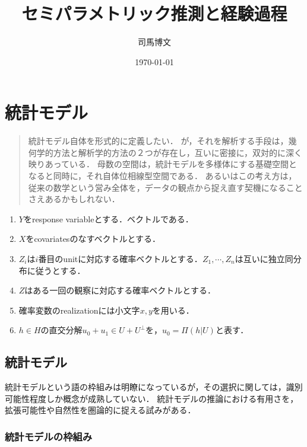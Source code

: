 \documentclass[uplatex,dvipdfmx]{jsreport}
\title{セミパラメトリック推測と経験過程}
\author{司馬博文}
\date{\today}
\begin{document}
\mgfamily
\tableofcontents

\chapter{統計モデル}

\begin{quotation}
    統計モデル自体を形式的に定義したい．
    が，それを解析する手段は，幾何学的方法と解析学的方法の２つが存在し，互いに密接に，双対的に深く映りあっている．
    母数の空間は，統計モデルを多様体にする基礎空間となると同時に，それ自体位相線型空間である．
    あるいはこの考え方は，従来の数学という営み全体を，データの観点から捉え直す契機になることさえあるかもしれない．
\end{quotation}

\begin{notation}
    \begin{enumerate}
        \item $Y$をresponse variableとする．ベクトルである．
        \item $X$をcovariatesのなすベクトルとする．
        \item $Z_i$は$i$番目のunitに対応する確率ベクトルとする．$Z_1,\cdots,Z_n$は互いに独立同分布に従うとする．
        \item $Z$はある一回の観察に対応する確率ベクトルとする．
        \item 確率変数のrealizationには小文字$x,y$を用いる．
        \item $h\in H$の直交分解$u_0+u_1\in U+U^\perp$を，$u_0=\Pi(h|U)$と表す．
    \end{enumerate}
\end{notation}

\section{統計モデル}

\begin{tcolorbox}[colframe=ForestGreen, colback=ForestGreen!10!white,breakable,colbacktitle=ForestGreen!40!white,coltitle=black,fonttitle=\bfseries\sffamily,
title=]
    統計モデルという語の枠組みは明瞭になっているが，その選択に関しては，識別可能性程度しか概念が成熟していない．
    統計モデルの推論における有用さを，拡張可能性や自然性を圏論的に捉える試みがある．
\end{tcolorbox}

\subsection{統計モデルの枠組み}
\end{document}
